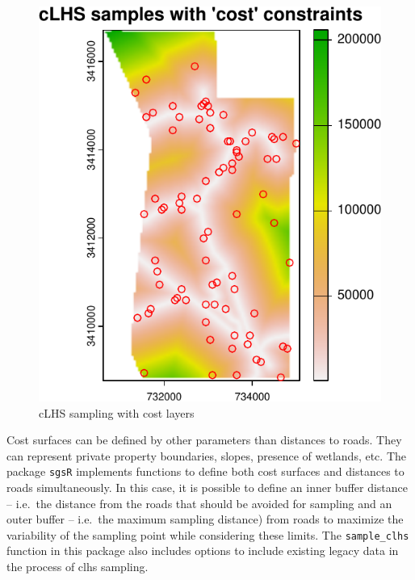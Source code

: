 \documentclass[
  10pt,
  b5paper,
  oneside]{book}
\begin{document}
\begin{figure}
\centering
\includegraphics{Technical-Manual-Soil-Sampling-Design_files/figure-latex/fig-22-1.pdf}
\caption{\label{fig:fig-22}cLHS sampling with cost layers}
\end{figure}

Cost surfaces can be defined by other parameters than distances to roads. They can represent private property boundaries, slopes, presence of wetlands, etc. The package \texttt{\textquotesingle{}sgsR\textquotesingle{}} implements functions to define both cost surfaces and distances to roads simultaneously. In this case, it is possible to define an inner buffer distance -- i.e.~the distance from the roads that should be avoided for sampling and an outer buffer -- i.e.~the maximum sampling distance) from roads to maximize the variability of the sampling point while considering these limits. The \texttt{\textquotesingle{}sample\_clhs\textquotesingle{}} function in this package also includes options to include existing legacy data in the process of clhs sampling.
\end{document}
